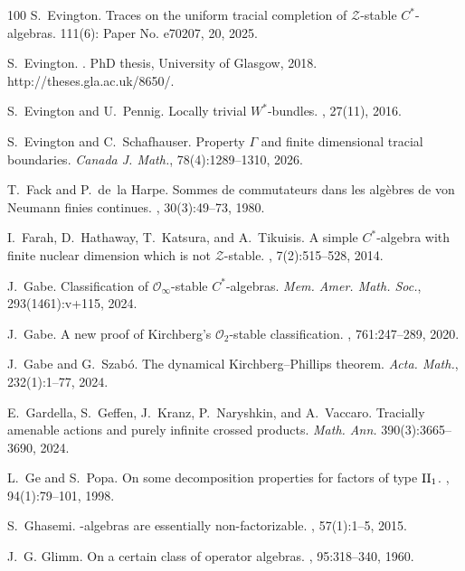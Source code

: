 \documentclass[a4paper,11pt]{amsart}
\theoremstyle{definition}
\numberwithin{equation}{section}
\numberwithin{theorem}{section}
\begin{document}
\begin{thebibliography}{100}
S.~Evington.
\newblock Traces on the uniform tracial completion of {$\mathcal{Z}$}-stable
  {$C^*$}-algebras.
 111(6): Paper No. e70207, 20, 2025.

S.~Evington.
.
\newblock PhD thesis, University of Glasgow, 2018.
\newblock http://theses.gla.ac.uk/8650/.

S.~Evington and U.~Pennig.
\newblock Locally trivial {$W^*$}-bundles.
, 27(11), 2016.

S.~Evington and C.~Schafhauser.
\newblock Property {$\Gamma$} and finite dimensional tracial boundaries.
\newblock \emph{Canada J. Math.}, 78(4):1289--1310, 2026.

T.~Fack and P.~de~la Harpe.
\newblock Sommes de commutateurs dans les alg\`ebres de von {N}eumann finies
  continues.
, 30(3):49--73, 1980.

I.~Farah, D.~Hathaway, T.~Katsura, and A.~Tikuisis.
\newblock A simple {$C^*$}-algebra with finite nuclear dimension which is not
  {$\mathcal Z$}-stable.
, 7(2):515--528, 2014.

J.~Gabe.
\newblock Classification of {$\mathcal O_\infty$}-stable {$C^*$}-algebras.
\newblock \emph{Mem. Amer. Math. Soc.}, 293(1461):v+115, 2024.

J.~Gabe.
\newblock A new proof of {K}irchberg's {$\mathcal O_2$}-stable classification.
, 761:247--289, 2020.

J.~Gabe and G.~Szab\'o.
\newblock The dynamical {K}irchberg--{P}hillips theorem.
\newblock \emph{Acta. Math.}, 232(1):1--77, 2024.

E.~Gardella, S.~Geffen, J.~Kranz, P.~Naryshkin, and A.~Vaccaro.
\newblock Tracially amenable actions and purely infinite crossed products.
\newblock \emph{Math. Ann.} 390(3):3665--3690, 2024.

L.~Ge and S.~Popa.
\newblock On some decomposition properties for factors of type {${\rm II}_1$}.
, 94(1):79--101, 1998.

S.~Ghasemi.
-algebras are essentially non-factorizable.
, 57(1):1--5, 2015.

J.~G. Glimm.
\newblock On a certain class of operator algebras.
, 95:318--340, 1960.


\end{thebibliography}
\end{document}
